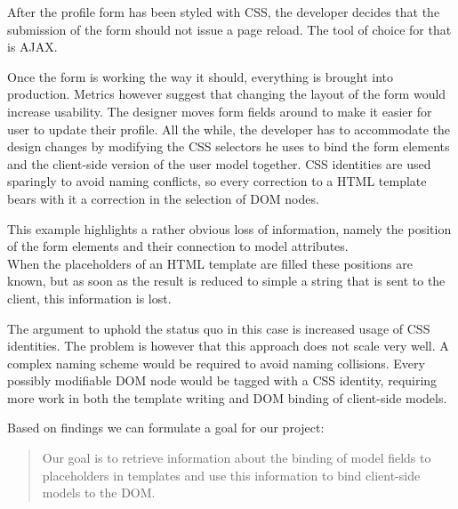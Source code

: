 \documentclass[thesis.tex]{subfiles}
\begin{document}
\begin{shaded}
\label{sec:scenario}
After the profile form has been styled with CSS, the developer decides that
the submission of the form should not issue a page reload. The tool of choice
for that is AJAX.

Once the form is working the way it should, everything is brought into
production. Metrics however suggest that changing the layout of the form would
increase usability.
The designer moves form fields around to make it easier for user to update
their profile.
All the while, the developer has to accommodate the design changes by modifying
the CSS selectors he uses to bind the form elements and the client-side version
of the user model together.
CSS identities are used sparingly to avoid naming conflicts, so every correction
to a HTML template bears with it a correction in the selection of DOM nodes.
\end{shaded}
This example highlights a rather obvious loss of information, namely
the position of the form elements and their connection to model attributes.\\
When the placeholders of an HTML template are filled these positions are known,
but as soon as the result is reduced to simple a string that is sent
to the client, this information is lost.

The argument to uphold the status quo in this case is increased usage of
CSS identities. The problem is however that this approach does not scale very well.
A complex naming scheme would be required to avoid naming collisions.
Every possibly modifiable DOM node would be tagged with a CSS identity,
requiring more work in both the template writing and DOM binding of
client-side models.

Based on findings we can formulate a goal for our project:

\begin{quote}
Our goal is to retrieve information about the binding of model fields to
placeholders in templates and use this information to bind client-side
models to the DOM.
\end{quote}
\end{document}
